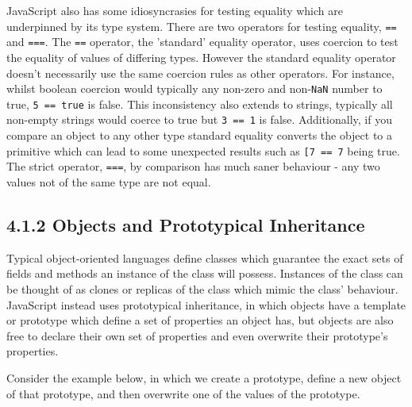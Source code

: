 \documentclass[]{article}
\begin{document}
JavaScript also has some idiosyncrasies for testing equality which are
underpinned by its type system. There are two operators for testing
equality, \texttt{==} and \texttt{===}. The \texttt{==} operator, the
'standard' equality operator, uses coercion to test the equality of
values of differing types. However the standard equality operator
doesn't necessarily use the same coercion rules as other operators. For
instance, whilst boolean coercion would typically any non-zero and
non-\texttt{NaN} number to true, \texttt{5\ ==\ true} is false. This
inconsistency also extends to strings, typically all non-empty strings
would coerce to true but
\texttt{\textquotesingle{}3\textquotesingle{}\ ==\ 1} is false.
Additionally, if you compare an object to any other type standard
equality converts the object to a primitive which can lead to some
unexpected results such as
\texttt{{[}\textquotesingle{}7\textquotesingle{}{]}\ ==\ 7} being true.
The strict operator, \texttt{===}, by comparison has much saner
behaviour - any two values not of the same type are not equal.

\hypertarget{header-n170}{%
\subsection{4.1.2 Objects and Prototypical
Inheritance}\label{header-n170}}

Typical object-oriented languages define classes which guarantee the
exact sets of fields and methods an instance of the class will possess.
Instances of the class can be thought of as clones or replicas of the
class which mimic the class' behaviour. JavaScript instead uses
prototypical inheritance, in which objects have a template or prototype
which define a set of properties an object has, but objects are also
free to declare their own set of properties and even overwrite their
prototype's properties.

Consider the example below, in which we create a prototype, define a new
object of that prototype, and then overwrite one of the values of the
prototype.
\end{document}
